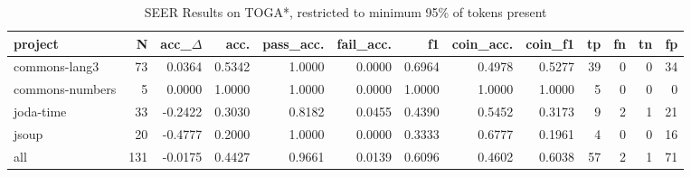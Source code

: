 \begin{table*}
\centering
\caption{SEER Results on TOGA*, restricted to minimum 95\% of tokens present}
\label{tab:toga_results_05}
\begin{tabular}{lrrrrrrrrrrrr}
\toprule
         project &    N &  acc\_$\Delta$ &    acc. &  pass\_acc. &  fail\_acc. &      f1 &  coin\_acc. &  coin\_f1 &  tp &  fn &  tn &  fp \\
\midrule
   commons-lang3 &   73 &      0.0364 &  0.5342 &     1.0000 &     0.0000 &  0.6964 &     0.4978 &   0.5277 &  39 &   0 &   0 &  34 \\
 commons-numbers &    5 &      0.0000 &  1.0000 &     1.0000 &     0.0000 &  1.0000 &     1.0000 &   1.0000 &   5 &   0 &   0 &   0 \\
       joda-time &   33 &     -0.2422 &  0.3030 &     0.8182 &     0.0455 &  0.4390 &     0.5452 &   0.3173 &   9 &   2 &   1 &  21 \\
           jsoup &   20 &     -0.4777 &  0.2000 &     1.0000 &     0.0000 &  0.3333 &     0.6777 &   0.1961 &   4 &   0 &   0 &  16 \\
             all &  131 &     -0.0175 &  0.4427 &     0.9661 &     0.0139 &  0.6096 &     0.4602 &   0.6038 &  57 &   2 &   1 &  71 \\
\bottomrule
\end{tabular}
\end{table*}
